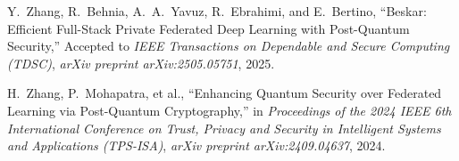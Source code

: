 \documentclass[11pt,a4paper]{report}
\begin{document}
\begin{enumerate}[label={[\arabic*]},itemsep=4pt]
  \item Y.~Zhang, R.~Behnia, A.~A.~Yavuz, R.~Ebrahimi, and E.~Bertino, ``Beskar: Efficient Full-Stack Private Federated Deep Learning with Post-Quantum Security,'' Accepted to \emph{IEEE Transactions on Dependable and Secure Computing (TDSC)}, \emph{arXiv preprint arXiv:2505.05751}, 2025.
  \item H.~Zhang, P.~Mohapatra, et al., ``Enhancing Quantum Security over Federated Learning via Post-Quantum Cryptography,'' in \emph{Proceedings of the 2024 IEEE 6th International Conference on Trust, Privacy and Security in Intelligent Systems and Applications (TPS-ISA)}, \emph{arXiv preprint arXiv:2409.04637}, 2024.
\end{enumerate}
\end{document}
